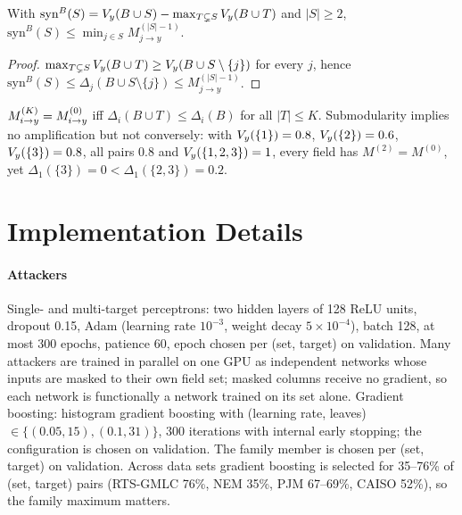 \begin{proposition}\label{prop:syn}
With $\mathrm{syn}^B(S)=V_{y}(B\cup S)-\max_{T\subsetneq S}V_{y}(B\cup T)$ and $|S|\ge 2$,
$\mathrm{syn}^B(S)\le\min_{j\in S}M^{(|S|-1)}_{j\to y}$.
\end{proposition}
\begin{proof}
$\max_{T\subsetneq S}V_{y}(B\cup T)\ge V_{y}(B\cup S\setminus\{j\})$ for every $j$, hence
$\mathrm{syn}^B(S)\le\Delta_j(B\cup S\setminus\{j\})\le M^{(|S|-1)}_{j\to y}$.
\end{proof}

\begin{remark}
$M^{(K)}_{i \to y}=M^{(0)}_{i\to y}$ iff $\Delta_i(B\cup T)\le\Delta_i(B)$ for all $|T|\le K$. Submodularity implies no
amplification but not conversely: with $V_{y}(\{1\})=0.8$, $V_{y}(\{2\})=0.6$, $V_{y}(\{3\})=0.8$, all pairs $0.8$
and $V_{y}(\{1,2,3\})=1$, every field has $M^{(2)}=M^{(0)}$, yet $\Delta_1(\{3\})=0<\Delta_1(\{2,3\})=0.2$.
\end{remark}

\section{Implementation Details}\label{app:impl}

\paragraph{Attackers} Single- and multi-target perceptrons: two hidden layers of 128 ReLU units,
dropout 0.15, Adam (learning rate $10^{-3}$, weight decay $5\times10^{-4}$), batch 128, at most 300
epochs, patience 60, epoch chosen per (set, target) on validation. Many attackers are trained in
parallel on one GPU as independent networks whose inputs are masked to their own field set; masked
columns receive no gradient, so each network is functionally a network trained on its set alone.
Gradient boosting: histogram gradient boosting with (learning rate, leaves) $\in\{(0.05,15),(0.1,31)\}$,
300 iterations with internal early stopping; the configuration is chosen on validation. The family
member is chosen per (set, target) on validation. Across data sets gradient boosting is selected for
35--76\% of (set, target) pairs (RTS-GMLC 76\%, NEM 35\%, PJM 67--69\%, CAISO 52\%), so the family maximum matters.

